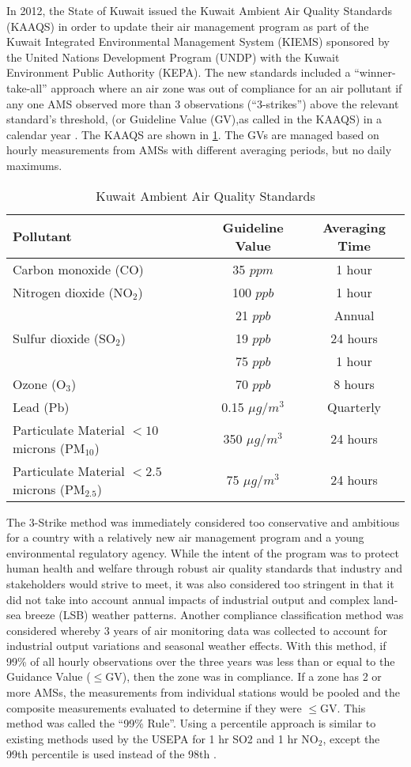 In 2012, the State of Kuwait issued the Kuwait Ambient Air Quality Standards (KAAQS) in order to update their air management program as part of the Kuwait Integrated Environmental Management System (KIEMS) sponsored by the United Nations Development Program (UNDP) with the Kuwait Environment Public Authority (KEPA). The new standards included a ``winner-take-all” approach where an air zone was out of compliance for an air pollutant if any one AMS observed more than 3 observations (``3-strikes”) above the relevant standard’s threshold,  (or Guideline Value (GV),as called in the KAAQS) in a calendar year \citep{KEPA2017}. The KAAQS are shown in \ref{tb:1kaaqs}. The GVs are managed based on hourly measurements from AMSs with different averaging periods, but no daily maximums.
%
\begin{table}[!htb]
\centering
\caption{Kuwait Ambient Air Quality Standards}
\label{tb:1kaaqs}
\begin{tabular}{@{}lcc@{}}
\toprule
\textbf{Pollutant} & \textbf{Guideline Value} & \textbf{Averaging Time} \\ \midrule
Carbon monoxide (CO) & 35 $ppm$ & 1 hour \\
Nitrogen dioxide (NO$_{2}$) & 100 $ppb$ & 1 hour \\
 & 21 $ppb$ & Annual \\
Sulfur dioxide (SO$_{2}$) & 19 $ppb$ & 24 hours \\
 & 75 $ppb$ & 1 hour \\
Ozone (O$_{3}$) & 70 $ppb$ & 8 hours \\
Lead (Pb) & 0.15 $\mu g/m^{3}$ & Quarterly \\
Particulate Material $<10$ microns (PM$_{10}$) & 350 $\mu g/m^{3}$ & 24 hours \\
Particulate Material $<2.5$ microns (PM$_{2.5}$) & 75 $\mu g/m^{3}$ & 24 hours \\ \bottomrule
\end{tabular}
\end{table}
%
The 3-Strike method was immediately considered too conservative and ambitious for a country with a relatively new air management program and a young environmental regulatory agency. While the intent of the program was to protect human health and welfare through robust air quality standards that industry and stakeholders would strive to meet, it was also considered too stringent in that it did not take into account annual impacts of industrial output and complex land-sea breeze (LSB) weather patterns. Another compliance classification method was considered whereby 3 years of air monitoring data was collected to account for industrial output variations and seasonal weather effects. With this method, if 99\% of all hourly observations over the three years was less than or equal to the Guidance Value ($\leq$GV), then the zone was in compliance. If a zone has 2 or more AMSs, the measurements from individual stations would be pooled and the composite measurements evaluated to determine if they were $\leq$GV. This method was called the ``99\% Rule”. Using a percentile approach is similar to existing methods used by the USEPA for 1 hr SO2 and 1 hr NO$_{2}$, except the 99th percentile is used instead of the 98th \citep{USEPA2016a}.
